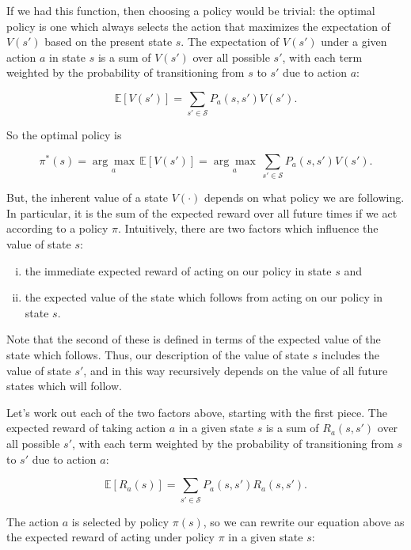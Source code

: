 \documentclass[12pt]{article}
\begin{document}
If we had this function, then choosing a policy would be trivial: the optimal policy is one which always selects the action that maximizes the expectation of $V(s')$ based on the present state $s$. The expectation of $V(s')$ under a given action $a$ in state $s$ is a sum of $V(s')$ over all possible $s'$, with each term weighted by the probability of transitioning from $s$ to $s'$ due to action $a$:

\begin{equation}
\mathbb{E}[V(s')] = \sum_{s' \in \mathscr{S}} P_a(s, s') V(s').
\end{equation}

So the optimal policy is

\begin{equation}
\pi^*(s) = \underset{a}{\arg\max} \, \mathbb{E}[V(s')] = \underset{a}{\arg\max} \, \sum_{s' \in \mathscr{S}} P_a(s, s') V(s').
\end{equation}

But, the inherent value of a state $V(\cdot)$ depends on what policy we are following. In particular, it is the sum of the expected reward over all future times if we act according to a policy $\pi$. Intuitively, there are two factors which influence the value of state $s$:

\begin{enumerate}[(i)]
\item{the immediate expected reward of acting on our policy in state $s$} and
\item{the expected value of the state which follows from acting on our policy in state $s$.}
\end{enumerate}

Note that the second of these is defined in terms of the expected value of the state which follows. Thus, our description of the value of state $s$ includes the value of state $s'$, and in this way recursively depends on the value of all future states which will follow.

Let's work out each of the two factors above, starting with the first piece. The expected reward of taking action $a$ in a given state $s$ is a sum of $R_a(s, s')$ over all possible $s'$, with each term weighted by the probability of transitioning from $s$ to $s'$ due to action $a$:

\begin{equation}
\mathbb{E}[R_a(s)] = \sum_{s' \in \mathscr{S}} P_a(s, s') R_a(s, s').
\end{equation}

The action $a$ is selected by policy $\pi(s)$, so we can rewrite our equation above as the expected reward of acting under policy $\pi$ in a given state $s$:
\end{document}
